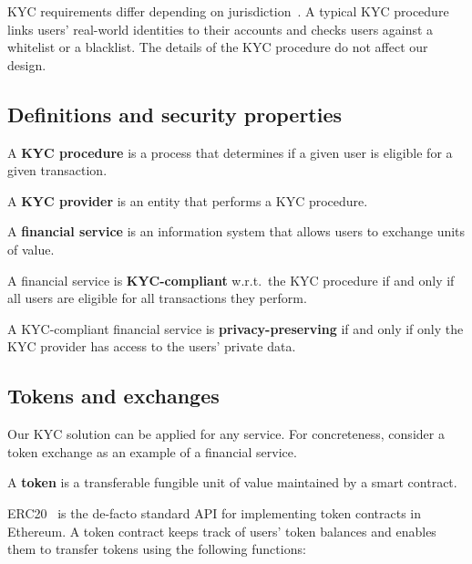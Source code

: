 KYC requirements differ depending on jurisdiction~\cite{PWC2015}.
A typical KYC procedure links users' real-world identities to their accounts and checks users against a whitelist or a blacklist.
The details of the KYC procedure do not affect our design.

\subsection{Definitions and security properties}

\begin{definition}
	A \textbf{KYC procedure} is a process that determines if a given user is eligible for a given transaction.
\end{definition}

\begin{definition}
	A \textbf{KYC provider} is an entity that performs a KYC procedure.
\end{definition}

\begin{definition}
	A \textbf{financial service} is an information system that allows users to exchange units of value.
\end{definition}

\begin{definition}
	A financial service is \textbf{KYC-compliant} w.r.t.~the KYC procedure if and only if all users are eligible for all transactions they perform.
\end{definition}

\begin{definition}
	A KYC-compliant financial service is \textbf{privacy-preserving} if and only if only the KYC provider has access to the users' private data.
\end{definition}


\subsection{Tokens and exchanges}

Our KYC solution can be applied for any service.
For concreteness, consider a token exchange as an example of a financial service.

\begin{definition}
	A \textbf{token} is a transferable fungible unit of value maintained by a smart contract.
\end{definition}

ERC20~\cite{Victor2019} is the de-facto standard API for implementing token contracts in Ethereum.
A token contract keeps track of users' token balances and enables them to transfer tokens using the following functions:

